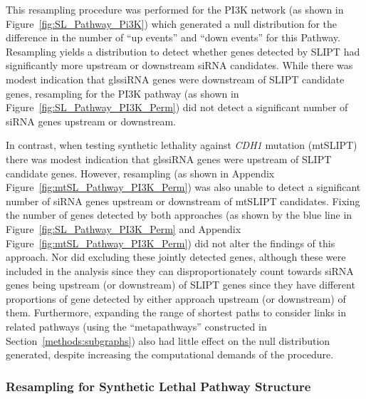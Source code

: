 This resampling procedure was performed for the PI3K network (as shown in Figure~\ref{fig:SL_Pathway_Pi3K}) which generated a null distribution for the difference in the number of ``up events'' and ``down events'' for this Pathway. Resampling yields a distribution to detect whether genes detected by \gls{SLIPT} had significantly more upstream or downstream \gls{siRNA} candidates. While there was modest indication that gls{siRNA} genes were downstream of \gls{SLIPT} candidate genes, resampling for the PI3K pathway (as shown in Figure~\ref{fig:SL_Pathway_PI3K_Perm}) did not detect a significant number of \gls{siRNA} genes upstream or downstream.

In contrast, when testing synthetic lethality against \textit{CDH1} mutation (mtSLIPT) there was modest indication that gls{siRNA} genes were upstream of \gls{SLIPT} candidate genes. However, resampling (as shown in Appendix Figure~\ref{fig:mtSL_Pathway_PI3K_Perm}) was also unable to detect a significant number of \gls{siRNA} genes upstream or downstream of mtSLIPT candidates. Fixing the number of genes detected by both approaches (as shown by the blue line in Figure~\ref{fig:SL_Pathway_PI3K_Perm} and Appendix Figure~\ref{fig:mtSL_Pathway_PI3K_Perm}) did not alter the findings of this approach. Nor did excluding these jointly detected genes, although these were included in the analysis since they can disproportionately count towards \gls{siRNA} genes being upstream (or downstream) of \gls{SLIPT} genes since they have different proportions of gene detected by either approach upstream (or downstream) of them. Furthermore, expanding the range of shortest paths to consider links in related pathways (using the ``metapathways'' constructed in Section~\ref{methods:subgraphs}) also had little effect on the null distribution generated, despite increasing the computational demands of the procedure.


\FloatBarrier

\subsubsection{Resampling for Synthetic Lethal Pathway Structure}  \label{chapt4:Structure_Perm}

